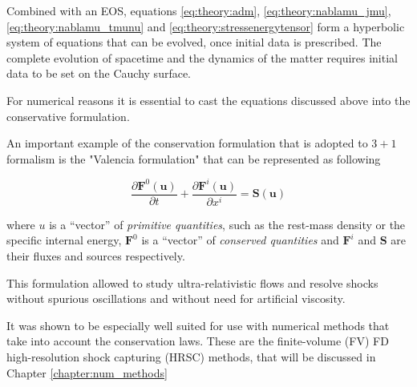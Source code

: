 \documentclass[11pt,a4paper,headinclude=true,DIV=14,BCOR=8mm,chapterprefix,listof=totoc,twoside,openright,abstracton]{scrbook}
\begin{document}
Combined with an EOS, equations \eqref{eq:theory:adm}, \eqref{eq:theory:nablamu_jmu}, \eqref{eq:theory:nablamu_tmunu} and \eqref{eq:theory:stressenergytensor} form a hyperbolic system of equations that can be evolved, once initial data is prescribed. The complete evolution of spacetime and the dynamics of the matter requires initial data to be set on the Cauchy surface.



For numerical reasons it is essential to cast the equations discussed above into the conservative formulation.

An important example of the conservation formulation that is adopted to $3 + 1$ formalism is the "Valencia formulation" \cite{Banyuls:1997} that can be represented as following

\begin{equation}
\frac{\partial\boldsymbol{F}^{0}(\boldsymbol{u})}{\partial t} + \frac{\partial\boldsymbol{F}^{i}(\boldsymbol{u})}{\partial x^{i}} = \boldsymbol{S}(\boldsymbol{u})
\label{eq:theory:valencia_formalism}
\end{equation}

where $u$ is a “vector” of \textit{primitive quantities}, such as the rest-mass density or the specific internal energy, $\boldsymbol{F}^0$ is a “vector” of \textit{conserved quantities} and $\boldsymbol{F}^i$ and $\boldsymbol{S}$ are their fluxes and sources respectively. 

This formulation allowed to study ultra-relativistic flows and resolve shocks without spurious oscillations and without need for artificial viscosity.

It was shown to be especially well suited for use with numerical methods that take into account the conservation laws. These are the finite-volume (FV) FD high-resolution shock capturing (HRSC) methods, that will be discussed in Chapter \ref{chapter:num_methods} 
\end{document}
